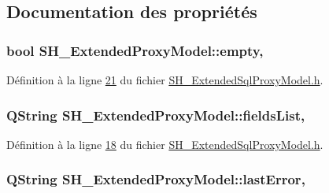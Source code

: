 \subsection{Documentation des propriétés}
\hypertarget{classSH__ExtendedProxyModel_a9e22d17af7776aca8052084cc33c3442}{
\subsubsection[{empty}]{\setlength{\rightskip}{0pt plus 5cm}bool S\-H\-\_\-\-Extended\-Proxy\-Model\-::empty\hspace{0.3cm}{\ttfamily [read]}, {\ttfamily [inherited]}}}\label{classSH__ExtendedProxyModel_a9e22d17af7776aca8052084cc33c3442}


Définition à la ligne \hyperlink{SH__ExtendedSqlProxyModel_8h_source_l00021}{21} du fichier \hyperlink{SH__ExtendedSqlProxyModel_8h_source}{S\-H\-\_\-\-Extended\-Sql\-Proxy\-Model.\-h}.

\hypertarget{classSH__ExtendedProxyModel_a15e779ba92384a57442d6bd79ef3d1d1}{
\subsubsection[{fields\-List}]{\setlength{\rightskip}{0pt plus 5cm}Q\-String S\-H\-\_\-\-Extended\-Proxy\-Model\-::fields\-List\hspace{0.3cm}{\ttfamily [read]}, {\ttfamily [inherited]}}}\label{classSH__ExtendedProxyModel_a15e779ba92384a57442d6bd79ef3d1d1}


Définition à la ligne \hyperlink{SH__ExtendedSqlProxyModel_8h_source_l00018}{18} du fichier \hyperlink{SH__ExtendedSqlProxyModel_8h_source}{S\-H\-\_\-\-Extended\-Sql\-Proxy\-Model.\-h}.

\hypertarget{classSH__ExtendedProxyModel_a1597853dfae8c3972ef3396293d5d0fc}{
\subsubsection[{last\-Error}]{\setlength{\rightskip}{0pt plus 5cm}Q\-String S\-H\-\_\-\-Extended\-Proxy\-Model\-::last\-Error\hspace{0.3cm}{\ttfamily [read]}, {\ttfamily [inherited]}}}\label{classSH__ExtendedProxyModel_a1597853dfae8c3972ef3396293d5d0fc}


